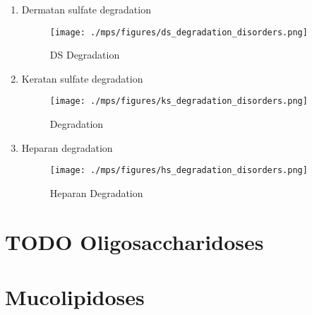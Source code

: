 \documentclass{scrartcl}
\begin{document}
\begin{enumerate}
\item Dermatan sulfate degradation
\label{sec:org7b47f25}
\begin{figure}[htbp]
\centering
\texttt{[image: ./mps/figures/ds\_degradation\_disorders.png]}
\caption[DS Degradation]{\label{fig:org2376eff}
DS Degradation}
\end{figure}


\item Keratan sulfate degradation
\label{sec:org3badb56}

\begin{figure}[htbp]
\centering
\texttt{[image: ./mps/figures/ks\_degradation\_disorders.png]}
\caption[KS Degradation]{\label{fig:orga9cb061}
Degradation}
\end{figure}


\item Heparan degradation
\label{sec:org54bbe80}

\begin{figure}[htbp]
\centering
\texttt{[image: ./mps/figures/hs\_degradation\_disorders.png]}
\caption[HS Degradation]{\label{fig:org41dbc62}
Heparan Degradation}
\end{figure}
\end{enumerate}

\section{{\bfseries\sffamily TODO} Oligosaccharidoses}
\label{sec:orgeac8dc9}

\section{Mucolipidoses}
\label{sec:orgbefa809}
\end{document}
